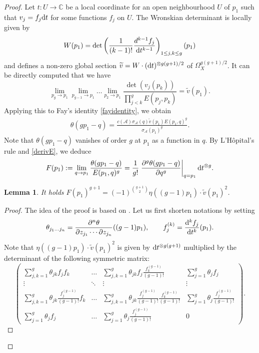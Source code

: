 \documentclass[10pt,a4paper]{amsart}
\numberwithin{equation}{section}
\newtheorem{Lemma}[Theorem]{Lemma}
\begin{document}
\begin{proof}
	Let $t\colon U\to \mathbb{C}$ be a local coordinate for an open neighbourhood $U$ of $p_1$ such that $v_j=f_{j}{\rm d}t$ for some functions $f_j$ on $U$.
	The Wronskian determinant is locally given by
	\[W(p_1)=\det\left(\frac{1}{(k-1)!}\frac{d^{k-1}f_j}{{\rm d}t^{k-1}}\right)_{1\le j,k\le g}(p_1)\]
	and defines a non-zero global section $\widetilde{v}=W\cdot({\rm d}t)^{\otimes g(g+1)/2}$ of $\Omega_X^{g(g+1)/2}$.
	It can be directly computed that we have
	\[\lim_{p_g\to p_1}\lim_{p_{g-1}\to p_1}\dots\lim_{p_2\to p_1}\frac{\det(v_j(p_k))}{\prod_{j<k}^g E(p_j,p_k)}=\widetilde{v}(p_1).\]
	Applying this to Fay's identity \eqref{fayidentity}, we obtain
	\begin{align}\label{thetawronsk}
		\theta(gp_1-q)=\frac{c(\mathcal{A})\sigma_{\mathcal{A}}(q) \widetilde{v}(p_1)E(p_1,q)^g}{\sigma_{\mathcal{A}}(p_1)^{g}}.
	\end{align}
	Note that $\theta(gp_1-q)$ vanishes of order $g$ at $p_1$ as a function in $q$. By L'H\^opital's rule and \eqref{derivE}, we deduce
	\[F(p_1):=\lim_{q\to p_1} \frac{\theta(gp_1-q)}{E(p_1,q)^g}=\frac{1}{g!}\left.\frac{\partial^g\theta(gp_1-q)}{\partial q^g}\right|_{q=p_1}{\rm d}t^{\otimes g}.\]
	\begin{Lemma}\label{lemma}
		It holds $F(p_1)^{g+1}=(-1)^{\binom{g+1}{2}}\eta((g-1)p_1)\cdot \widetilde{v}(p_1)^{2}$.
	\end{Lemma}
	\begin{proof}
		The idea of the proof is based on \cite[Section 5]{dJo10}. Let us first shorten notations by setting
		\[\theta_{j_1\dots j_n}=\frac{\partial^n\theta}{\partial z_{j_1}\cdots \partial z_{j_n}} ((g-1)p_1),\qquad f_j^{(k)}=\frac{{\rm d}^{k}f_j}{{\rm d}t^k}(p_1).\]
		Note that $\eta((g-1)p_1)\cdot \widetilde{v}(p_1)^{2}$ is given by ${\rm d}t^{\otimes g(g+1)}$ multiplied by the determinant of the following symmetric matrix:
		\[\begin{pmatrix}\sum_{j,k=1}^g\theta_{jk}f_j f_k & \dots & \sum_{j,k=1}^g\theta_{jk}f_j \frac{f_k^{(g-1)}}{(g-1)!} & \sum_{j=1}^g \theta_j f_j\\
			\vdots&\ddots&\vdots&\vdots\\
			\sum_{j,k=1}^g\theta_{jk}\frac{f_j^{(g-1)}}{(g-1)!} f_k & \dots & \sum_{j,k=1}^g\theta_{jk}\frac{f_j^{(g-1)}}{(g-1)!} \frac{f_k^{(g-1)}}{(g-1)!} & \sum_{j=1}^g \theta_j \frac{f_j^{(g-1)}}{(g-1)!}\\
			\sum_{j=1}^g\theta_{j} f_j & \dots & \sum_{j=1}^g\theta_{j}\frac{f_j^{(g-1)}}{(g-1)!} & 0\end{pmatrix}.\]
		

\end{proof}
\end{proof}
\end{document}

